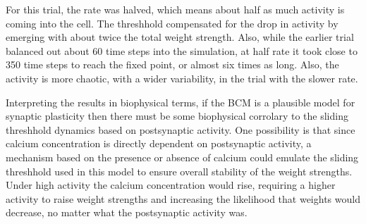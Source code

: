 \documentclass[12pt]{article}
\begin{document}
For this trial, the rate was halved, which means about half as much activity is coming into the cell.  The threshhold compensated for the drop in activity by emerging with about twice the total weight strength.  Also, while the earlier trial balanced out about 60 time steps into the simulation, at half rate it took close to 350 time steps to reach the fixed point, or almost six times as long.  Also, the activity is more chaotic, with a wider variability, in the trial with the slower rate.

Interpreting the results in biophysical terms, if the BCM is a plausible model for synaptic plasticity then there must be some biophysical corrolary to the sliding threshhold dynamics based on postsynaptic activity.  One possibility is that since calcium concentration is directly dependent on postsynaptic activity, a mechanism based on the presence or absence of calcium could emulate the sliding threshhold used in this model to ensure overall stability of the weight strengths.  Under high activity the calcium concentration would rise, requiring a higher activity to raise weight strengths and increasing the likelihood that weights would decrease, no matter what the postsynaptic activity was.
\end{document}
